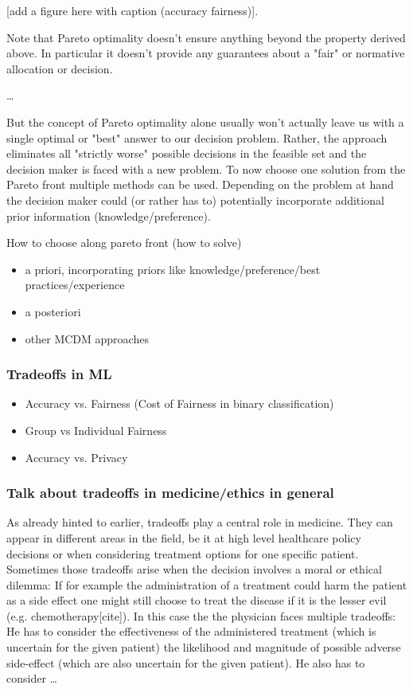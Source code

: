 	[add a figure here with caption (accuracy fairness)].

	Note that Pareto optimality doesn't ensure anything beyond the property derived above.
	In particular it doesn't provide any guarantees about a "fair" or normative allocation or decision.

	\dots

	But the concept of Pareto optimality alone usually won't actually leave us with a single optimal or "best" answer to our decision problem.
	Rather, the approach eliminates all "strictly worse" possible decisions in the feasible set and the decision maker is faced with a new problem.
	To now choose one solution from the Pareto front multiple methods can be used.
	Depending on the problem at hand the decision maker could (or rather has to) potentially incorporate additional prior information (knowledge/preference).

	How to choose along pareto front (how to solve)

	\begin{itemize}
	\item a priori, incorporating priors like knowledge/preference/best practices/experience
	\item a posteriori
	\item other MCDM approaches
	\end{itemize}


	\subsubsection{Tradeoffs in ML}
	\begin{itemize}
		\item Accuracy vs. Fairness (Cost of Fairness in binary classification) 
		\item Group vs Individual Fairness
		\item Accuracy vs. Privacy
	\end{itemize}



	\subsubsection{Talk about tradeoffs in medicine/ethics in general}
	As already hinted to earlier, tradeoffs play a central role in medicine.
	They can appear in different areas in the field, be it at high level healthcare policy decisions or when considering treatment options for one specific patient.
	Sometimes those tradeoffs arise when the decision involves a moral or ethical dilemma:
	If for example the administration of a treatment could harm the patient as a side effect one might still choose to treat the disease if it is the lesser evil (e.g. chemotherapy[cite]).
	In this case the the physician faces multiple tradeoffs:
	He has to consider the effectiveness of the administered treatment (which is uncertain for the given patient) the likelihood and magnitude of possible adverse side-effect (which are also uncertain for the given patient).
	He also has to consider \dots
	
